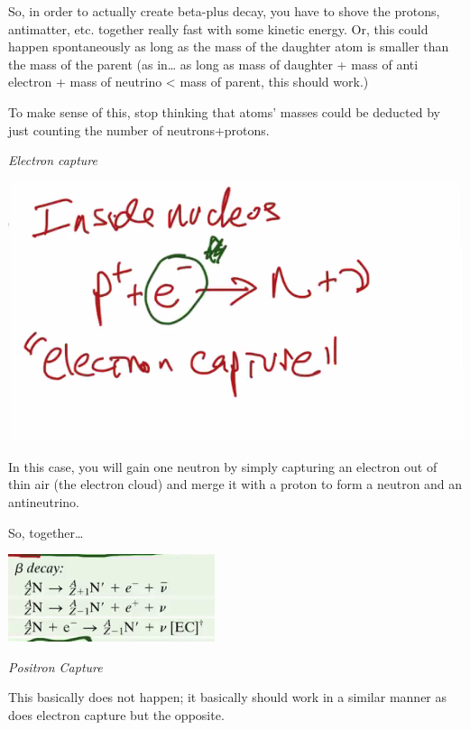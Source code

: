 \documentclass[letterpaper]{article}
\begin{document}
So, in order to actually create beta-plus decay, you have to shove the
protons, antimatter, etc. together really fast with some kinetic energy.
Or, this could happen spontaneously as long as the mass of the daughter
atom is smaller than the mass of the parent (as in\ldots{} as long as mass of
daughter + mass of anti electron + mass of neutrino < mass of parent,
this should work.)

To make sense of this, stop thinking that atoms' masses could be
deducted by just counting the number of neutrons+protons.

\emph{Electron capture}

\begin{center}
\includegraphics[width=.9\linewidth]{electroncapture.png}
\end{center}

In this case, you will gain one neutron by simply capturing an electron
out of thin air (the electron cloud) and merge it with a proton to form
a neutron and an antineutrino.

So, together\ldots{}

\begin{center}
\includegraphics[width=.9\linewidth]{betadecayformal.png}
\end{center}

\emph{Positron Capture}

This basically does not happen; it basically should work in a similar
manner as does electron capture but the opposite.
\end{document}
